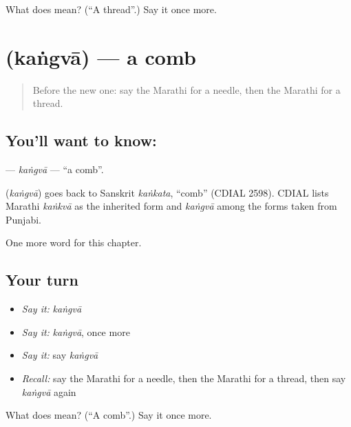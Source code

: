 \begin{tcolorbox}[breakable,colback=teal!4,colframe=teal!35!black,title={Before you move on}]
What does  mean? (\textquotedblleft{}A thread\textquotedblright{}.) Say it once more.
\end{tcolorbox}
\section[\texorpdfstring{\mr{कंगवा} (kaṅgvā)}{कंगवा (kaṅgvā)}]{ (kaṅgvā) — a comb}

\label{lesson:MR-C132-kangva}



\begin{quote}
Before the new one: say the Marathi for a needle, then the Marathi for a thread.
\end{quote}

\subsection*{You'll want to know: }
\textbf{} — \emph{kaṅgvā} — \textquotedblleft{}a comb\textquotedblright{}.

\begin{cousinweb}
\textbf{} (\emph{kaṅgvā}) goes back to Sanskrit \emph{kaṅkata}, \textquotedblleft{}comb\textquotedblright{} (CDIAL 2598). CDIAL lists Marathi \emph{kaṅkvā} as the inherited form and \emph{kaṅgvā} among the forms taken from Punjabi.
\end{cousinweb}

\begin{grammarlens}[title={What you've built}]
One more word for this chapter.
\end{grammarlens}

\subsection*{Your turn}
\begin{itemize}
\raggedright
  \item \emph{Say it:} \emph{kaṅgvā}
  \item \emph{Say it:} \emph{kaṅgvā}, once more
  \item \emph{Say it:} say \emph{kaṅgvā}
  \item \emph{Recall:} say the Marathi for a needle, then the Marathi for a thread, then say \emph{kaṅgvā} again
\end{itemize}

\begin{tcolorbox}[breakable,colback=teal!4,colframe=teal!35!black,title={Before you move on}]
What does  mean? (\textquotedblleft{}A comb\textquotedblright{}.) Say it once more.
\end{tcolorbox}
